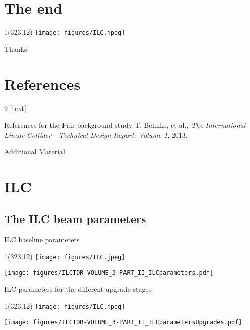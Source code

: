 \documentclass[xcolor={dvipsnames}]{beamer}
\newcommand{\ilclogo}{
  \setlength{\TPHorizModule}{1pt}
  \setlength{\TPVertModule}{1pt}
  \begin{textblock}{1}(323,12)
   \texttt{[image: figures/ILC.jpeg]}
  \end{textblock}
}
\begin{document}

\section*{The end}
{
\begin{frame}
\ilclogo
\begin{center}
\textcolor{RubineRed}{
	\LARGE Thanks!\\
}
\end{center}
\end{frame}
}

\section*{References}
\begin{thebibliography}{9}
[text]
\begin{frame}{References for the Pair background study}
\tiny
{}
 T. Behnke, et al., \emph{The International Linear Collider - Technical Design Report, Volume 1}, 2013.
\end{frame}
\end{thebibliography}

\appendix

\begin{frame}
\begin{center}
\LARGE Additional Material
\end{center}
  \tableofcontents
\end{frame}

\section{ILC}

\subsection{The ILC beam parameters}
\begin{frame}{ILC baseline parameters}
\ilclogo
\begin{center}
	\texttt{[image: figures/ILCTDR-VOLUME\_3-PART\_II\_ILCparameters.pdf]}
\end{center}
\end{frame}
\begin{frame}{ILC parameters for the different upgrade stages}
\ilclogo
\begin{center}
	\texttt{[image: figures/ILCTDR-VOLUME\_3-PART\_II\_ILCparametersUpgrades.pdf]}
\end{center}
\end{frame}
\end{document}
